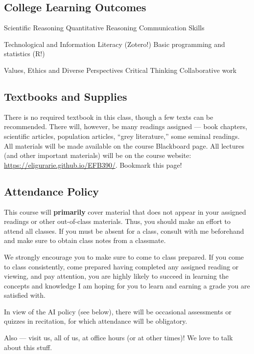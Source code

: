 \documentclass[
  letterpaper,
  DIV=11,
  numbers=noendperiod]{scrartcl}
\begin{document}
\subsection{College Learning Outcomes}\label{college-learning-outcomes}

Scientific Reasoning \textbar{} Quantitative Reasoning \textbar{}
Communication Skills

Technological and Information Literacy (Zotero!) \textbar{} Basic
programming and statistics (R!)

Values, Ethics and Diverse Perspectives \textbar{} Critical Thinking
\textbar{} Collaborative work

\subsection{Textbooks and Supplies}\label{textbooks-and-supplies}

There is no required textbook in this class, though a few texts can be
recommended. There will, however, be many readings assigned --- book
chapters, scientific articles, population articles, ``grey literature,''
some seminal readings. All materials will be made available on the
course Blackboard page. All lectures (and other important materials)
will be on the course website:
\url{https://eligurarie.github.io/EFB390/}. Bookmark this page!

\subsection{Attendance Policy}\label{attendance-policy}

This course will \textbf{primarily} cover material that does not appear
in your assigned readings or other out-of-class materials. Thus, you
should make an effort to attend all classes. If you must be absent for a
class, consult with me beforehand and make sure to obtain class notes
from a classmate.

We strongly encourage you to make sure to come to class prepared. If you
come to class consistently, come prepared having completed any assigned
reading or viewing, and pay attention, you are highly likely to succeed
in learning the concepts and knowledge I am hoping for you to learn and
earning a grade you are satisfied with.

In view of the AI policy (see below), there will be occasional
assessments or quizzes in recitation, for which attendance will be
obligatory.

Also --- visit us, all of us, at office hours (or at other times)! We
love to talk about this stuff.
\end{document}
